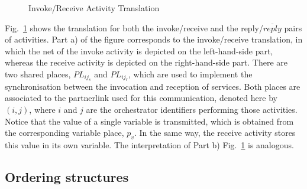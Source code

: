 \begin{itemize}
\begin{figure}[h]
{{{}
}}
\caption{\label{fig:comm}Invoke/Receive Activity
Translation} 
\end{figure}
Fig.~\ref{fig:comm} shows the translation for both the invoke/receive and the reply/$\overline{reply}$ pairs of activities. Part a) of the figure corresponds to the invoke/receive translation, in which the net of the invoke activity is depicted on the left-hand-side part, whereas the receive activity is depicted on the right-hand-side part. There are two shared places, $PL_{ij{_s}}$ and $PL_{ij{_r}}$, which are used to implement the synchronisation between the invocation and reception of services. Both places are associated to the partnerlink used for this communication, denoted here by $(i,j)$, where $i$ and $j$ are the orchestrator identifiers performing those activities. Notice that the value of a single variable is transmitted, which is obtained from the corresponding variable place, $p_v$. In the same way, the receive activity stores this value in its own variable. The interpretation of Part b) Fig.~\ref{fig:comm} is analogous.  
\end{itemize}
%
\subsection*{Ordering structures}

